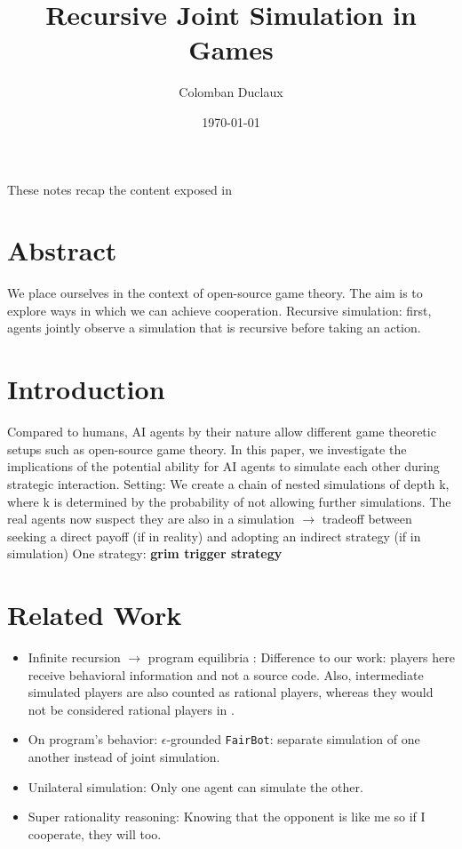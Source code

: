 \documentclass{article}
\title{Recursive Joint Simulation in Games}
\author{Colomban Duclaux}
\date{\today}
\begin{document}
\maketitle
These notes recap the content exposed in \cite{kovarik2024recursivejointsimulationgames}

\section{Abstract}
We place ourselves in the context of open-source game theory. 
The aim is to explore ways in which we can achieve cooperation.
Recursive simulation: first, agents jointly observe a simulation that is recursive before taking an action.

\section{Introduction}
Compared to humans, AI agents by their nature allow different game theoretic setups such as open-source game theory.
In this paper, we investigate the implications of the potential ability for AI agents to simulate each other during strategic interaction.
Setting: We create a chain of nested simulations of depth k, where k is determined by the probability of not allowing further simulations.
The real agents now suspect they are also in a simulation $\to$ tradeoff between seeking a direct payoff (if in reality) and adopting an indirect strategy (if in simulation)
One strategy: \textbf{grim trigger strategy}

\section{Related Work}
\begin{itemize}
    \item Infinite recursion $\to$ program equilibria \cite{critch2022cooperativeuncooperativeinstitutiondesigns}: Difference to our work: players here receive behavioral information and not a source code. Also, intermediate simulated players are also counted as rational players, whereas they would not be considered rational players in \cite{critch2022cooperativeuncooperativeinstitutiondesigns}.
    \item On program's behavior: $\epsilon$-grounded \texttt{FairBot}: separate simulation of one another instead of joint simulation.
    \item Unilateral simulation: Only one agent can simulate the other.
    \item Super rationality reasoning: Knowing that the opponent is like me so if I cooperate, they will too.
\end{itemize}
\end{document}
